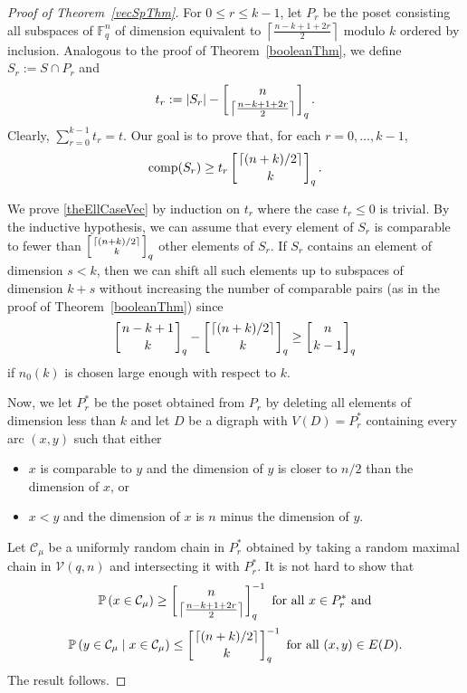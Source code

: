 \documentclass[11 pt]{article}
\theoremstyle{definition}
\theoremstyle{case}
\numberwithin{equation}{section}
\DeclareMathOperator{\comp}{comp}
\newcommand{\qbinom}[3]{\left[\genfrac{}{}{0pt}{}{#1}{#2}\right]_{#3}}
\newcommand{\Vectors}[2]{\mathcal{V}\left(#1,#2\right)}
\begin{document}
\begin{proof}[Proof of Theorem~\ref{vecSpThm}]
For $0\leq r\leq k-1$, let $P_r$ be the poset consisting all subspaces of $\mathbb{F}_q^n$ of dimension equivalent to $\left\lceil \frac{n-k+1+2r}{2}\right\rceil$ modulo $k$ ordered by inclusion. Analogous to the proof of Theorem~\ref{booleanThm}, we define $S_r:=S\cap P_{r}$ and
\[t_r:=|S_r| - \qbinom{n}{\left\lceil \frac{n-k+1+2r}{2}\right\rceil}{q}.\] 
Clearly, $\sum_{r=0}^{k-1}t_r = t$. Our goal is to prove that, for each $r=0,\dots,k-1$,
\begin{equation}\label{theEllCaseVec}\comp(S_r)\geq t_r\qbinom{\left\lceil (n+k)/2\right\rceil}{k}{q}.\end{equation} 

We prove \eqref{theEllCaseVec} by induction on $t_r$ where the case $t_r\leq 0$ is trivial. By the inductive hypothesis, we can assume that every element of $S_r$ is comparable to fewer than $\qbinom{\left\lceil (n+k)/2\right\rceil}{k}{q}$ other elements of $S_r$. If $S_r$ contains an element of dimension $s<k$, then we can shift all such elements up to subspaces of dimension $k+s$ without increasing the number of comparable pairs (as in the proof of Theorem~\ref{booleanThm}) since
\[\qbinom{n-k+1}{k}{q} - \qbinom{\left\lceil (n+k)/2\right\rceil}{k}{q} \geq \qbinom{n}{k-1}{q}\]
if $n_0(k)$ is chosen large enough with respect to $k$. 

Now, we let $P_r^*$ be the poset obtained from $P_r$ by deleting all elements of dimension less than $k$ and let $D$ be a digraph with $V(D)=P_r^*$ containing every arc $(x,y)$ such that either
\begin{itemize}
\item $x$ is comparable to $y$ and the dimension of $y$ is closer to $n/2$ than the dimension of $x$, or
\item $x<y$ and the dimension of $x$ is $n$ minus the dimension of $y$. 
\end{itemize}
Let $\mathcal{C}_\mu$ be a uniformly random chain in $P_r^*$ obtained by taking a random maximal chain in $\Vectors{q}{n}$ and intersecting it with $P_r^*$. It is not hard to show that
\[\mathbb{P}\left(x\in \mathcal{C}_\mu\right)\geq \qbinom{n}{\left\lceil \frac{n-k+1+2r}{2}\right\rceil}{q}^{-1}\text{ for all $x\in P_r^*$ and}\]
\[\mathbb{P}\left(y\in\mathcal{C}_\mu\mid x\in\mathcal{C}_\mu\right)\leq \qbinom{\left\lceil (n+k)/2\right\rceil}{k}{q}^{-1}\text{ for all $(x,y)\in E(D)$.}\]
The result follows.
\end{proof}
\end{document}
